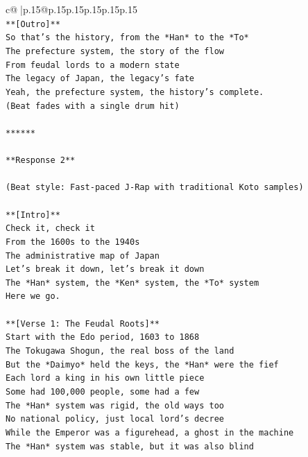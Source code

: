 \documentclass{article}
\begin{document}
{\begin{supertabular}{c@{$\;$}|p{.15\linewidth}@{}p{.15\linewidth}p{.15\linewidth}p{.15\linewidth}p{.15\linewidth}p{.15\linewidth}}
{{{\\ 
\texttt{**{[}Outro{]}**} \\
\texttt{So that's the history, from the *Han* to the *To*} \\
\texttt{The prefecture system, the story of the flow} \\
\texttt{From feudal lords to a modern state} \\
\texttt{The legacy of Japan, the legacy's fate} \\
\texttt{Yeah, the prefecture system, the history's complete.} \\
\texttt{(Beat fades with a single drum hit)} \\
\\ 
\texttt{******} \\
\\ 
\texttt{**Response 2**} \\
\\ 
\texttt{(Beat style: Fast{-}paced J{-}Rap with traditional Koto samples)} \\
\\ 
\texttt{**{[}Intro{]}**} \\
\texttt{Check it, check it} \\
\texttt{From the 1600s to the 1940s} \\
\texttt{The administrative map of Japan} \\
\texttt{Let's break it down, let's break it down} \\
\texttt{The *Han* system, the *Ken* system, the *To* system} \\
\texttt{Here we go.} \\
\\ 
\texttt{**{[}Verse 1: The Feudal Roots{]}**} \\
\texttt{Start with the Edo period, 1603 to 1868} \\
\texttt{The Tokugawa Shogun, the real boss of the land} \\
\texttt{But the *Daimyo* held the keys, the *Han* were the fief} \\
\texttt{Each lord a king in his own little piece} \\
\texttt{Some had 100,000 people, some had a few} \\
\texttt{The *Han* system was rigid, the old ways too} \\
\texttt{No national policy, just local lord's decree} \\
\texttt{While the Emperor was a figurehead, a ghost in the machine} \\
\texttt{The *Han* system was stable, but it was also blind} \\
}}}
\end{supertabular}}
\end{document}

